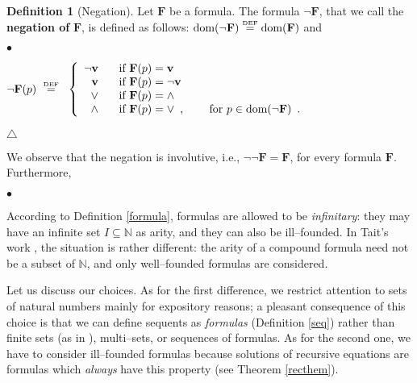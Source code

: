 \documentclass[copyright,creativecommons]{eptcs}
\def\ie{i.e., }
\newcommand{\vv}{\langle}
\newcommand{\ww}{\rangle}
\newcommand{\NN}{\mathbb{N}}
\newcommand{\eqdef}{\stackrel{\text{\tiny \textnormal{DEF}}}{=}}
\newcommand{\arpp}[2]{\textstyle\vee_{#2} \bF_{#1}}
\newcommand{\arnn}[2]{\textstyle\wedge_{#2} \bF_{#1}}
\newcommand{\bF}{\mathbf{F}}
\newcommand{\bbv}{\mathbf{v}}
\newcommand{\dom}{\ensuremath{\textnormal{dom}}}
\theoremstyle{definition}
\newtheorem{Definition}[theorem]{Definition}
\newcommand{\squishlist}{
 \begin{list}{$\bullet$}
  { \setlength{\itemsep}{0pt}
     \setlength{\parsep}{3pt}
     \setlength{\topsep}{3pt}
     \setlength{\partopsep}{0pt}
     \setlength{\leftmargin}{1em}
     \setlength{\labelwidth}{1.5em}
     \setlength{\labelsep}{0.5em} } }
\newcommand{\squishend}{
  \end{list}  }
\begin{document}
 \begin{Definition}[Negation]
 Let $\bF$ be a formula.
 The formula $\neg\bF$, that we call
 the \textbf{negation of} $\bF$, is defined
 as follows:
$\dom(\neg\bF) \eqdef  \dom(\bF)$ and

\squishlist
\item[]
{\centering
${\neg\bF}(p) \ \eqdef \ $ $\left\{
  \begin{array}{rl}
    \neg \bbv\enspace &  \hbox{ if ${\bF}(p) = \bbv$} \\
    \bbv\enspace &  \hbox{ if ${\bF}(p) = \neg \bbv$} \\
    \vee\enspace &  \hbox{ if ${\bF}(p) = \wedge$} \\
    \wedge\enspace &  \hbox{ if ${\bF}(p) = \vee$\enspace, \qquad for $p \in \dom(\neg\bF)$\enspace. }
  \end{array}
\right.$

\vspace{-0.55cm}
\hfill$\triangle$ \par}
\squishend


 \end{Definition}
 We observe that the negation is involutive, \ie
$\neg \neg \bF = \bF$, for every formula $\bF$. Furthermore,
\squishlist
\item[] \centering{$\neg\arpp{\vv i \ww}{I} \ = \  \wedge_I \neg\bF_{\vv i \ww}$ \ \ \ \ and \ \ \ \
$\neg\arnn{\vv i \ww}{I} \ = \  \vee_I \neg\bF_{\vv i \ww}$\enspace.  \par}
\squishend




 According to Definition \ref{formula},
 formulas are allowed to  be  \emph{infinitary}:
they  may have an infinite set $I \subseteq \NN$ as  arity, and they  can also be ill--founded. In
Tait's work \cite{Tait68},  the situation is rather different:
 the arity of a compound  formula
 need not  be a subset of $\NN$, and  only
well--founded formulas are  considered.

Let us  discuss our choices.
As for the first difference,
we restrict  attention to sets of natural numbers mainly for expository reasons; a pleasant  consequence of
this choice is
 that we can define  sequents as \emph{formulas}  (Definition \ref{seq})
rather than finite sets (as  in \cite{Tait68}),
multi--sets, or sequences of  formulas.
As for the second one, we have to  consider ill--founded
formulas because   solutions of   recursive equations
are formulas which \emph{always}   have this property (see Theorem \ref{recthem}).
\end{document}
